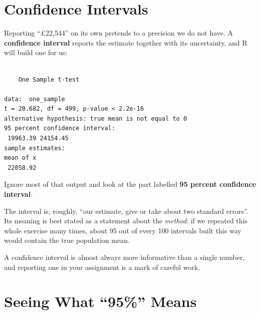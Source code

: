 \documentclass[
  letterpaper,
  DIV=11,
  numbers=noendperiod]{scrreprt}
\newenvironment{Shaded}{\begin{snugshade}}{\end{snugshade}}
\newcommand{\AttributeTok}[1]{\textcolor[rgb]{0.40,0.45,0.13}{#1}}
\newcommand{\DecValTok}[1]{\textcolor[rgb]{0.68,0.00,0.00}{#1}}
\newcommand{\FunctionTok}[1]{\textcolor[rgb]{0.28,0.35,0.67}{#1}}
\newcommand{\NormalTok}[1]{\textcolor[rgb]{0.00,0.23,0.31}{#1}}
\newcommand{\OtherTok}[1]{\textcolor[rgb]{0.00,0.23,0.31}{#1}}
\newcommand{\SpecialCharTok}[1]{\textcolor[rgb]{0.37,0.37,0.37}{#1}}
\begin{document}
\section*{Confidence Intervals}\label{confidence-intervals}


Reporting ``£22,544'' on its own pretends to a precision we do not have.
A \textbf{confidence interval} reports the estimate together with its
uncertainty, and R will build one for us:

\begin{Shaded}
\end{Shaded}

\begin{verbatim}

    One Sample t-test

data:  one_sample
t = 20.682, df = 499, p-value < 2.2e-16
alternative hypothesis: true mean is not equal to 0
95 percent confidence interval:
 19963.39 24154.45
sample estimates:
mean of x 
 22058.92 
\end{verbatim}

Ignore most of that output and look at the part labelled \textbf{95
percent confidence interval}.

The interval is, roughly, ``our estimate, give or take about two
standard errors''. Its meaning is best stated as a statement about the
\emph{method}: if we repeated this whole exercise many times, about 95
out of every 100 intervals built this way would contain the true
population mean.

A confidence interval is almost always more informative than a single
number, and reporting one in your assignment is a mark of careful work.

\section*{Seeing What ``95\%'' Means}\label{seeing-what-95-means}
\end{document}
